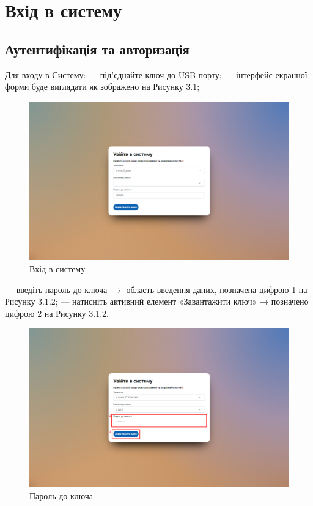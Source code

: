 \chapter{Вхід в систему}

\section{Аутентифікація та авторизація}

Для входу в Систему:
--- під’єднайте ключ до USB порту;
--- інтерфейс екранної форми буде виглядати як зображено на Рисунку 3.1;

\begin{figure}[!htbp]
\centerline{\includegraphics[width=\textwidth]{img/3.1.1.png}}
\caption{Вхід в систему}
\end{figure}

\newpage

--- введіть пароль до ключа $\rightarrow$ область введення даних, позначена цифрою 1 на Рисунку 3.1.2;
--- натисніть активний елемент «Завантажити ключ» → позначено цифрою 2 на Рисунку 3.1.2.

\begin{figure}[!htbp]
\centerline{\includegraphics[width=\textwidth]{img/3.1.2.png}}
\caption{Пароль до ключа}
\end{figure}

